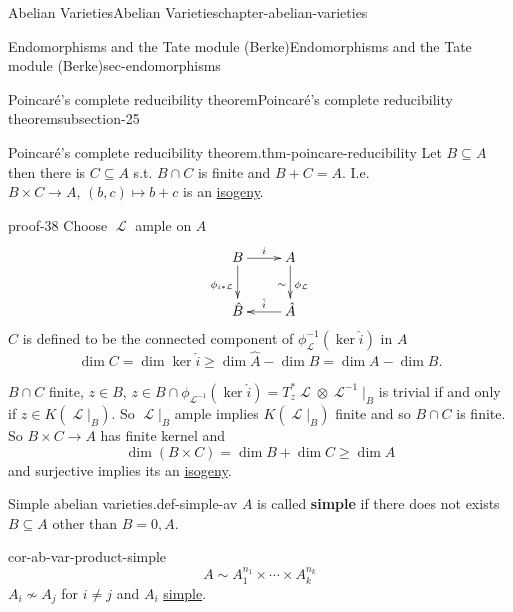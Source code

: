 \documentclass[oneside,10pt,]{book}
\newcommand{\terminology}[1]{\textbf{#1}}
\numberwithin{equation}{section}
\newcommand{\sheaf}[1]{\operatorname{\mathcal{#1}}}
\begin{document}
\begin{chapterptx}{Abelian Varieties}{}{Abelian Varieties}{}{}{chapter-abelian-varieties}
\begin{sectionptx}{Endomorphisms and the Tate module (Berke)}{}{Endomorphisms and the Tate module (Berke)}{}{}{sec-endomorphisms}
\typeout{************************************************}
%
\begin{subsectionptx}{Poincaré's complete reducibility theorem}{}{Poincaré's complete reducibility theorem}{}{}{subsection-25}
\begin{theorem}{Poincaré's complete reducibility theorem.}{}{thm-poincare-reducibility}%
\hypertarget{p-209}{}%
Let \(B\subseteq A\) then there is \(C\subseteq A\) s.t. \(B \cap C\) is finite and \(B+C = A\). I.e. \(B\times C \to A,\,(b,c) \mapsto b+c\) is an \hyperref[def-supersing-isog-isog]{isogeny}.%
\end{theorem}
\begin{proofptx}{}{proof-38}
\hypertarget{p-210}{}%
Choose \(\sheaf L\) ample on \(A\)%
\begin{equation*}
\xymatrix{
B\ar[r]^i \ar[d]_{\phi_{i*\sheaf L}} & A \ar[d]_\sim^{\phi_{\sheaf L}} \\
\hat B & \hat A \ar[l]_{\hat i}
}
\end{equation*}
\(C\) is defined to be the connected component of \(\phi^{-1}_{\sheaf L}(\ker \hat i)\) in \(A\)%
\begin{equation*}
\dim C = \dim \ker \hat i \ge \dim \hat A - \dim \hat B = \dim A - \dim B\text{.}
\end{equation*}
%
\par
\hypertarget{p-211}{}%
\(B \cap C\) finite, \(z\in B\), \(z\in B\cap \phi_{\sheaf L^{-1}} (\ker \hat i) = T_z^* \sheaf L \otimes \sheaf L^{-1} |_B\) is trivial if and only if \(z\in K(\sheaf L|_B)\). So \(\sheaf L|_B\) ample implies \(K(\sheaf L|_B)\) finite and so \(B\cap C\) is finite. So \(B\times C \to A\) has finite kernel and%
\begin{equation*}
\dim (B\times C) = \dim B + \dim C \ge \dim A
\end{equation*}
and surjective implies its an \hyperref[def-supersing-isog-isog]{isogeny}.%
\end{proofptx}
\begin{definition}{Simple abelian varieties.}{def-simple-av}%
\hypertarget{p-212}{}%
\(A\) is called \terminology{simple} if there does not exists \(B\subseteq A\) other than \(B = 0,A\).%
\end{definition}
\begin{corollary}{}{}{cor-ab-var-product-simple}%
\hypertarget{p-213}{}%
%
\begin{equation*}
A \sim A_1^{n_1} \times \cdots \times A_k^{n_k}
\end{equation*}
\(A_i \not\sim A_j\) for \(i\ne j\) and \(A_i\) \hyperref[def-simple-av]{simple}.%

\end{corollary}
\end{subsectionptx}
\end{sectionptx}
\end{chapterptx}
\end{document}
